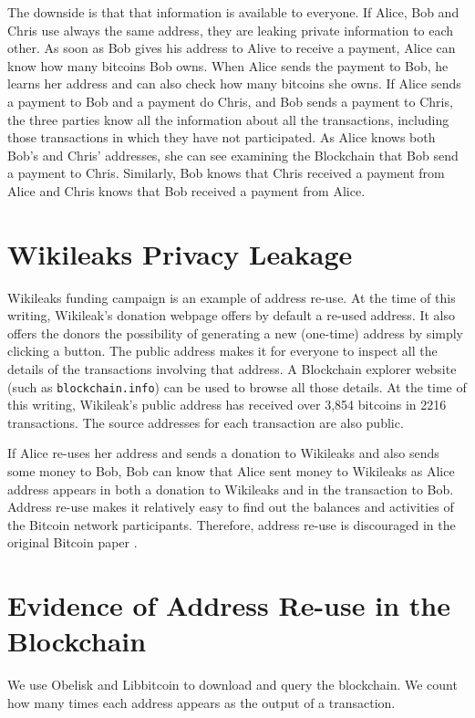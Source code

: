 \documentclass[journal]{IEEEtran}
\begin{document}
The downside is that that information is available to everyone.
If Alice, Bob and Chris use always the same address, they are leaking private information to each other.
As soon as Bob gives his address to Alive to receive a payment, Alice can know how many bitcoins Bob owns.
When Alice sends the payment to Bob, he learns her address and can also check how many bitcoins she owns.
If Alice sends a payment to Bob and a payment do Chris, and Bob sends a payment to Chris, the three parties know all the information about all the transactions, including those transactions in which they have not participated.
As Alice knows both Bob's and Chris' addresses, she can see examining the Blockchain that Bob send a payment to Chris.
Similarly, Bob knows that Chris received a payment from Alice and Chris knows that Bob received a payment from Alice.

\section{Wikileaks Privacy Leakage}

Wikileaks funding campaign is an example of address re-use.
At the time of this writing, Wikileak's donation webpage offers by default a re-used address.
It also offers the donors the possibility of generating a new (one-time) address by simply clicking a button.
The public address makes it for everyone to inspect all the details of the transactions involving that address.
A Blockchain explorer website (such as \texttt{blockchain.info}) can be used to browse all those details.
At the time of this writing, Wikileak's public address has received over 3,854 bitcoins in 2216 transactions.
The source addresses for each transaction are also public.

If Alice re-uses her address and sends a donation to Wikileaks and also sends some money to Bob, Bob can know that Alice sent money to Wikileaks as Alice address appears in both a donation to Wikileaks and in the transaction to Bob.
Address re-use makes it relatively easy to find out the balances and activities of the Bitcoin network participants.
Therefore, address re-use is discouraged in the original Bitcoin paper \cite{nakamoto2008bpp}.

\section{Evidence of Address Re-use in the Blockchain}

We use Obelisk and Libbitcoin to download and query the blockchain.
We count how many times each address appears as the output of a transaction.
\end{document}
